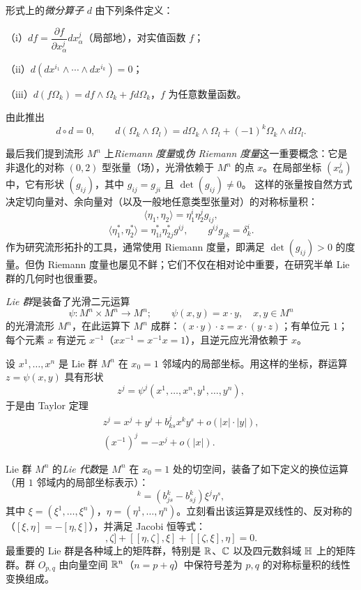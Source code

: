 形式上的\emph{微分算子} $d$ 由下列条件定义：

（i）$df=\dfrac{\partial f}{\partial x_\alpha^j}dx_\alpha^j$（局部地），对实值函数 $f$；

（ii）$d(dx^{i_1}\wedge\cdots\wedge dx^{i_k})=0$；

（iii）$d(f\Omega_k)=df\wedge\Omega_k+fd\Omega_k$，$f$ 为任意数量函数。

由此推出
\[
d\circ d=0,\qquad d(\Omega_k\wedge\Omega_l)=d\Omega_k\wedge\Omega_l+(-1)^k\Omega_k\wedge d\Omega_l.
\]

最后我们提到流形 $M^n$ 上\emph{Riemann 度量}或\emph{伪 Riemann 度量}这一重要概念：它是非退化的对称 $(0,2)$ 型张量（场），光滑依赖于 $M^n$ 的点 $x$。在局部坐标 $(x_\alpha^j)$ 中，它有形状 $(g_{ij})$，其中 $g_{ij}=g_{ji}$ 且 $\det(g_{ij})\ne0$。
这样的张量按自然方式决定切向量对、余向量对（以及一般地任意类型张量对）的对称标量积：
\[
\langle\eta_1,\eta_2\rangle=\eta_1^i\eta_2^jg_{ij},
\]
\[
\langle\eta_1^*,\eta_2^*\rangle=\eta_{1i}^*\eta_{2j}^*g^{ij},\qquad g^{ij}g_{jk}=\delta_k^i.
\]
作为研究流形拓扑的工具，通常使用 Riemann 度量，即满足 $\det(g_{ij})>0$ 的度量。但伪 Riemann 度量也屡见不鲜；它们不仅在相对论中重要，在研究半单 Lie 群的几何时也很重要。

\emph{Lie 群}是装备了光滑二元运算
\[
\psi:M^n\times M^n\to M^n;\qquad \psi(x,y)=x\cdot y,\quad x,y\in M^n
\]
的光滑流形 $M^n$，在此运算下 $M^n$ 成群：$(x\cdot y)\cdot z=x\cdot(y\cdot z)$；有单位元 $1$；每个元素 $x$ 有逆元 $x^{-1}$（$xx^{-1}=x^{-1}x=1$），且逆元应光滑依赖于 $x$。

设 $x^1,\ldots,x^n$ 是 Lie 群 $M^n$ 在 $x_0=1$ 邻域内的局部坐标。用这样的坐标，群运算 $z=\psi(x,y)$ 具有形状
\[
z^j=\psi^j(x^1,\ldots,x^n,y^1,\ldots,y^n),
\]
于是由 Taylor 定理
\begin{equation}
\begin{gathered}
z^j=x^j+y^j+b_{ks}^jx^ky^s+o(|x|\cdot|y|),\\
(x^{-1})^j=-x^j+o(|x|).
\end{gathered}\tag{1.5}
\end{equation}

Lie 群 $M^n$ 的\emph{Lie 代数}是 $M^n$ 在 $x_0=1$ 处的切空间，装备了如下定义的换位运算（用 $1$ 邻域内的局部坐标表示）：
\begin{equation}
[\xi,\eta]^k=(b_{js}^k-b_{sj}^k)\xi^j\eta^s, \tag{1.6}
\end{equation}
其中 $\xi=(\xi^1,\ldots,\xi^n)$，$\eta=(\eta^1,\ldots,\eta^n)$。立刻看出该运算是双线性的、反对称的（$[\xi,\eta]=-[\eta,\xi]$），并满足 Jacobi 恒等式：
\begin{equation}
[[\xi,\eta],\zeta]+[[\eta,\zeta],\xi]+[[\zeta,\xi],\eta]=0. \tag{1.7}
\end{equation}
最重要的 Lie 群是各种域上的矩阵群，特别是 $\mathbb{R}$、$\mathbb{C}$ 以及四元数斜域 $\mathbb{H}$ 上的矩阵群。群 $O_{p,q}$ 由向量空间 $\mathbb{R}^n$（$n=p+q$）中保符号差为 $p,q$ 的对称标量积的线性变换组成。

